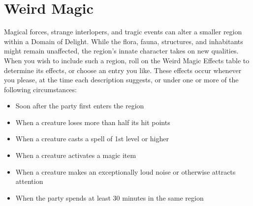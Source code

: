 \documentclass[10pt,a4paper,twoside,twocolumn,openany,nodeprecatedcode,bg=print]{dndbook}
\begin{document}
\section{Weird Magic}
Magical forces, strange interlopers, and tragic events can alter a smaller region within a Domain of Delight. While the flora, fauna, structures, and inhabitants might remain unaffected, the region's innate character takes on new qualities.
When you wish to include such a region, roll on the Weird Magic Effects table to determine its effects, or choose an entry you like. These effects occur whenever you please, at the time each description suggests, or under one or more of the following circumstances:
\begin{itemize}

\item Soon after the party first enters the region
\item When a creature loses more than half its hit points
\item When a creature casts a spell of 1st level or higher
\item When a creature activates a magic item
\item When a creature makes an exceptionally loud noise or otherwise attracts attention
\item When the party spends at least 30 minutes in the same region
\end{itemize}
\end{document}
